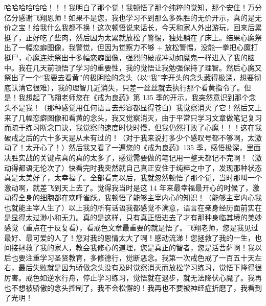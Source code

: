 \begin{case}
    哈哈哈哈哈哈！！！我明白了那个觉！我顿悟了那个纯粹的觉知，那个安住！万分亿分感谢飞翔恩师！如果不是您，我也学习不到那么多殊胜的无价开示，真的是无价之宝！给我什么我都不换！这次顿悟说来话长，今天和家人外出游玩，回来后累挺了，正好吃了些肉，然后因为太累就放松了警惕，独处躺在了床上。结果心魔祭出了一幅恋癖图像，我警觉，但因为觉察力不够 + 放松警惕，没能一拳把心魔打挺尸，心魔连续祭出十多幅恋癖图像，强烈的破戒冲动如魔鬼一样进入了我的脑中。我在几天前顿悟了学习的重要性，我的觉悟让我勉强保持了理智。然后心魔又祭出了一个“我要去看黄”的极阴险的念头（以“我”字开头的念头藏得极深，想要彻底认清它很难），我的理智几近消失，只差一丝丝就去执行那个看黄指令了。但是！我想起了飞翔老师您在《戒为良药》第 135 季的开示，我突然意识到那个念头不是我！（那种感觉用任何语言去形容都显得苍白）我觉察消灭了它！然后又上来了几幅恋癖图像和看黄的念头，我又觉察消灭，由于平常只学习文章做笔记复习而疏于练习断念口诀，我觉察的速度时快时慢，但我仍然打败了心魔！！！这在我破戒之后的六十多天是从未有过的！（对于我来说打多少个感叹号都不够啊，太激动了！太开心了！）然后我又看了一遍您的《戒为良药》135 季，感悟极深，里面决胜实战的关键点真的真的太多了，感觉需要做的笔记用一整天都记不完啊！（激动得都语无伦次了）快看完时我突然就自己真正安住于纯粹之中了，发现那种状态真是太美好了，太幸福了。全部看完以后，我就忽然顿悟了那个觉，当时那叫一个激动啊，就差飞到天上去了。觉得我当时是这 14 年来最幸福最开心的时候了，激动得全身的细胞都在欢呼雀跃。我顿悟了能够主宰内心的知识！（能够主宰内心我也就能主宰人生了）以上我的所有话语我都感觉不满意，语言在亲身经历面前实在是显得太过渺小和无力。真的是这样，只有真正悟进去了才有那种身临其境的美妙感觉（重点在于反复看），看戒色文章最重要的就是悟了。飞翔老师，您是我见过最好、最可爱的人了！您对我的恩情太大了啊！感动流涕！您拯救了我的一生，也间接拯救了我的家人，教会我修心的道理，您是真正的智者，您是活菩萨啊！我以后也要注重学习圣贤教育，多修德行，觉断恶念。我第一次戒色戒了一百五十天左右，最后失败就是因为骄傲念头没有及时觉察消灭而放松学习练习，觉悟下降得很厉害。戒色如逆水行舟，停止学习练习，觉悟就在退步，就无法降伏心魔了。我再也不想被骄傲的念头控制了，我不会松懈的！我再也不要被神经症折磨了，我看到了光明！


\end{case}

